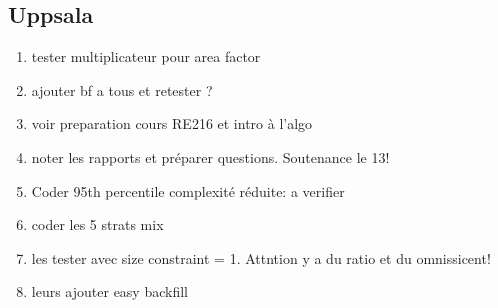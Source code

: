 \documentclass[a4paper]{article}
\begin{document}
	\subsection{Uppsala}
		\begin{enumerate}
			\item tester multiplicateur pour area factor
			\item ajouter bf a tous et retester ?
			\item voir preparation cours RE216 et intro à l'algo
			\item noter les rapports et préparer questions. Soutenance le 13!
			\item Coder 95th percentile complexité réduite: a verifier
			\item coder les 5 strats mix
			\item les tester avec size constraint = 1. Attntion  y a du  ratio et du omnissicent!
			\item leurs ajouter easy backfill
			

\end{enumerate}
\end{document}
